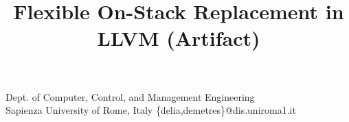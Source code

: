 \documentclass[nocopyrightspace,10pt]{sigplanconf}
\begin{document}
\title{Flexible On-Stack Replacement in LLVM (Artifact)}

           {{\small Dept. of Computer, Control, and Management Engineering\\Sapienza University of Rome, Italy}} %
           {\{delia,demetres\}@dis.uniroma1.it} %

\maketitle


\newcommand{\separateAEdoc}{}


\end{document}
